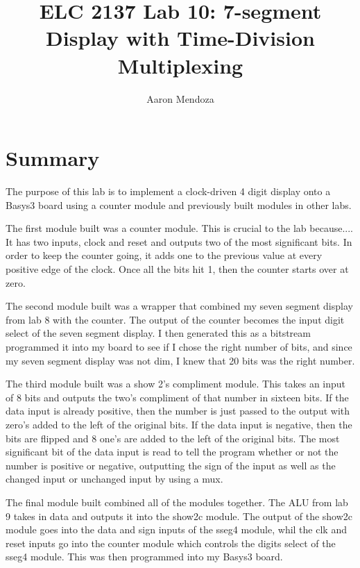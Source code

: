 \documentclass[11pt]{article}
\begin{document}
\title{ELC 2137 Lab 10: 7-segment Display with Time-Division Multiplexing}
\author{Aaron Mendoza}

\maketitle


\section*{Summary}

The purpose of this lab is to implement a clock-driven 4 digit display onto a Basys3 board using a counter module and previously built modules in other labs.

The first module built was a counter module. This is crucial to the lab because.... It has two inputs, clock and reset and outputs two of the most significant bits. In order to keep the counter going, it adds one to the previous value at every positive edge of the clock. Once all the bits hit 1, then the counter starts over at zero. 

The second module built was a wrapper that combined my seven segment display from lab 8 with the counter. The output of the counter becomes the input digit select of the seven segment display. I then generated this as a bitstream programmed it into my board to see if I chose the right number of bits, and since my seven segment display was not dim, I knew that 20 bits was the right number.

The third module built was a show 2's compliment module. This takes an input of 8 bits and outputs the two's compliment of that number in sixteen bits. If the data input is already positive, then the number is just passed to the output with zero's added to the left of the original bits. If the data input is negative, then the bits are flipped and 8 one's are added to the left of the original bits. The most significant bit of the data input is read to tell the program whether or not the number is positive or negative, outputting the sign of the input as well as the changed input or unchanged input by using a mux.

The final module built combined all of the modules together. The ALU from lab 9 takes in data and outputs it into the show2c module. The output of the show2c module goes into the data and sign inputs of the sseg4 module, whil the clk and reset inputs go into the counter module which controls the digits select of the sseg4 module. This was then programmed into my Basys3 board.
\end{document}
